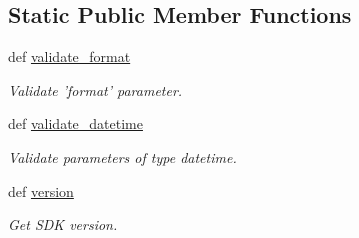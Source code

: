 \subsection*{Static Public Member Functions}
\begin{DoxyCompactItemize}
\item 
def \hyperlink{classtune_1_1management_1_1endpoints_1_1base_1_1TuneManagementBase_a038cfc72de4ae1d6adb6734c1fd70456}{validate\-\_\-format}
\begin{DoxyCompactList}\small\item\em Validate 'format' parameter. \end{DoxyCompactList}\item 
def \hyperlink{classtune_1_1management_1_1endpoints_1_1base_1_1TuneManagementBase_a438af78ad95093fdd2296a09c376201d}{validate\-\_\-datetime}
\begin{DoxyCompactList}\small\item\em Validate parameters of type datetime. \end{DoxyCompactList}\item 
def \hyperlink{classtune_1_1management_1_1endpoints_1_1base_1_1TuneManagementBase_ace2789409c9468dd54f0e94e6fa768cd}{version}
\begin{DoxyCompactList}\small\item\em Get S\-D\-K version. \end{DoxyCompactList}\end{DoxyCompactItemize}
